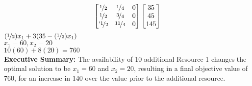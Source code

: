 \documentclass[answers]{exam}
\begin{document}
\begin{questions}
\begin{solution}
\begin{parts}
		\[\begin{bmatrix}
			\nicefrac{1}{2} & \nicefrac{1}{4} & 0 \\
			\nicefrac{1}{2} & \nicefrac{3}{4} & 0 \\`
			\nicefrac{1}{2} & \nicefrac{11}{4} & 0 \\
		\end{bmatrix}\begin{bmatrix}
			35 \\ 45 \\ 145 
		\end{bmatrix}\]
		\((\nicefrac{1}{2})x_1+3(35-(\nicefrac{1}{2})x_1)\) \\
		\(x_1 = 60, x_2 = 20\) \\
		\(10(60)+8(20)=760\) \bigskip \\
		\textbf{Executive Summary: }
		The availability of 10 additional Resource 1 changes the optimal solution to be \(x_1=60\) and \(x_2=20\), resulting in a final objective value of 760, for an increase in 140 over the value prior to the additional resource.
		
		

\end{parts}
\end{solution}
\end{questions}
\end{document}
